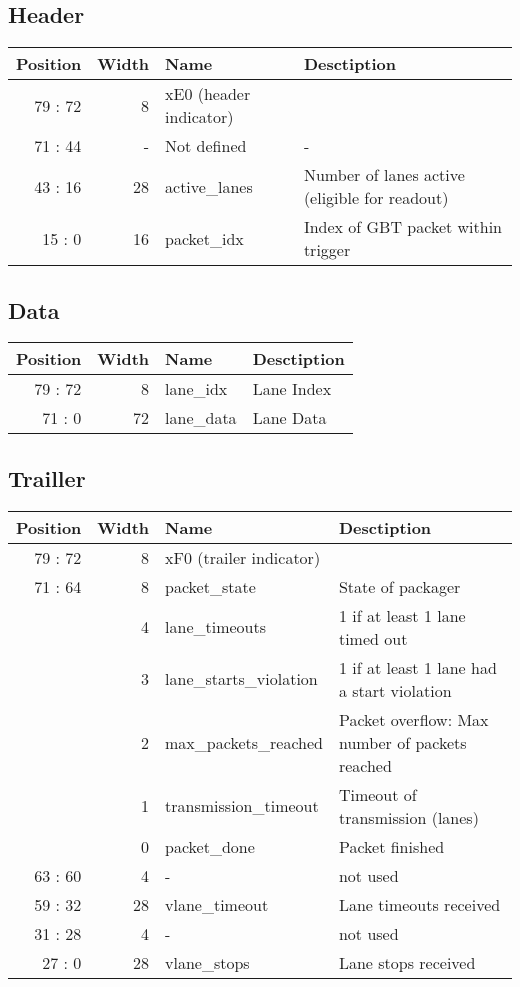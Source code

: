 \documentclass[a4paper,11pt,wide]{scrartcl}
\begin{document}
\subsection{Header}
\begin{tabular}[htb]{r|r|l|l}
  Position & Width & Name & Desctiption \\
  \hline
  79 : 72 & 8 & xE0 (header indicator) \\
  71 : 44 & - & Not defined & - \\
  43 : 16 & 28 & active\_lanes & Number of lanes active (eligible for
                                  readout) \\
  15 : 0 & 16 & packet\_idx & Index of GBT packet within trigger \\
\end{tabular}
\subsection{Data}
\begin{tabular}[htb]{r|r|l|l}
  Position & Width & Name & Desctiption \\
  \hline
  79 : 72 & 8 & lane\_idx & Lane Index \\
  71 : 0  & 72 & lane\_data & Lane Data
\end{tabular}
\subsection{Trailler}
\begin{tabular}[htb]{r|r|l|l}
  Position & Width & Name & Desctiption \\
  \hline
  79 : 72 & 8 & xF0 (trailer indicator) \\
  71 : 64 & 8 & packet\_state & State of packager \\
   & 4 & lane\_timeouts & 1 if at least 1 lane timed out \\
   & 3 & lane\_starts\_violation & 1 if at least 1 lane had a start violation \\
   & 2 & max\_packets\_reached & Packet overflow: Max number of packets reached \\
   & 1 & transmission\_timeout & Timeout of transmission (lanes)\\
   & 0 & packet\_done & Packet finished \\
  63 : 60 & 4 & - & not used \\
  59 : 32 & 28 & vlane\_timeout & Lane timeouts received \\
  31 : 28 & 4 & - & not used \\
  27 : 0 & 28 & vlane\_stops & Lane stops received \\
\end{tabular}
\end{document}
